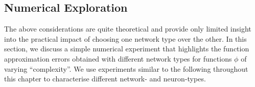 

\subsection{Numerical Exploration}
\label{sec:dendritic_computation_theory_numerical}

The above considerations are quite theoretical and provide only limited insight into the practical impact of choosing one network type over the other.
In this section, we discuss a simple numerical experiment that highlights the function approximation errors obtained with different network types for functions $\phi$ of varying \enquote{complexity}.
We use experiments similar to the following throughout this chapter to characterise different network- and neuron-types.

